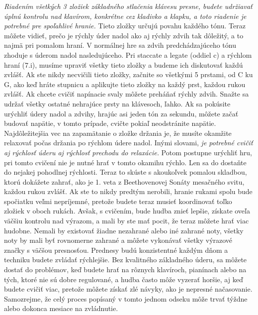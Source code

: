 \emph{Riadením všetkých 3 zložiek základného stlačenia klávesu presne, budete udržiavať úplnú kontrolu nad klavírom, konkrétne cez kladivko a klapku, a toto riadenie je potrebné pre spoľahlivé hranie.} Tieto zložky určujú povahu každého tónu. Teraz môžete vidieť, prečo je rýchly úder nadol ako aj rýchly zdvih tak dôležitý, a to najmä pri pomalom hraní. V normálnej hre sa zdvih predchádzajúceho tónu zhoduje s úderom nadol nasledujúceho. Pri staccate a legate (oddiel c) a rýchlom hraní (7.i), musíme upraviť všetky tieto zložky a budeme ich diskutovať každú zvlášť.  Ak ste nikdy necvičili tieto zložky, začnite so všetkými 5 prstami, od C ku G, ako keď hráte stupnicu a aplikujte tieto zložky na každý prst, každou rukou zvlášť. Ak chcete cvičiť napínacie svaly môžete preháňať rýchly zdvih. Snažte sa udržať všetky ostatné nehrajúce prsty na klávesoch, ľahko. Ak sa pokúsite urýchliť údery nadol a zdvihy, hrajúc asi jeden tón za sekundu, môžete začať budovať napätie, v tomto prípade, cvičte pokiaľ neodstránite napätie. Najdôležitejšia vec na zapamätanie o zložke držania je, že musíte okamžite relaxovať počas držania po rýchlom údere nadol. Inými slovami, \emph{je potrebné cvičiť aj rýchlosť úderu aj rýchlosť prechodu do relaxácie.} Potom postupne urýchliť hru, pri tomto cvičení nie je nutné hrať v tomto okamihu rýchlo. Len sa do dostaňte do nejakej pohodlnej rýchlosti. Teraz to skúste s akoukoľvek pomalou skladbou, ktorú dokážete zahrať, ako je 1. veta z Beethovenovej Sonáty mesačného svitu, každou rukou zvlášť. Ak ste to nikdy predtým nerobili, hranie rukami spolu bude spočiatku veľmi nepríjemné, pretože budete teraz musieť koordinovať toľko zložiek v oboch rukách. Avšak, s cvičením, bude hudba znieť lepšie, získate oveľa väčšiu kontrolu nad výrazom, a mali by ste mať pocit, že teraz môžete hrať viac hudobne. Nemali by existovať žiadne nezahrané alebo iné zahrané noty, všetky noty by mali byť rovnomerne zahrané a môžete vykonávať všetky výrazové značky s väčšou presnosťou. Prednesy budú konzistentné každým dňom a techniku budete zvládať rýchlejšie. Bez kvalitného základného úderu, sa môžete dostať do problémov, keď budete hrať na rôznych klavíroch, pianínach alebo na tých, ktoré nie sú dobre regulované, a hudba často môže vyzerať  horšie, aj keď budete cvičiť viac, pretože môžete získať zlé návyky, ako je nepresné načasovanie. Samozrejme, že celý proces popísaný v tomto jednom odseku môže  trvať týždne alebo dokonca mesiace na zvládnutie.

